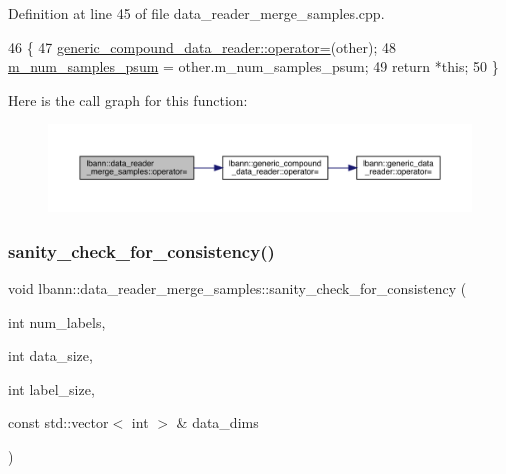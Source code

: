 Definition at line 45 of file data\+\_\+reader\+\_\+merge\+\_\+samples.\+cpp.


\begin{DoxyCode}
46                                           \{
47   \hyperlink{classlbann_1_1generic__compound__data__reader_a7ece97b6fd2bc62da4d98f29cfb50155}{generic\_compound\_data\_reader::operator=}(other);
48   \hyperlink{classlbann_1_1data__reader__merge__samples_afd297d61c11bb6b0d03ce64836bd1300}{m\_num\_samples\_psum} = other.m\_num\_samples\_psum;
49   \textcolor{keywordflow}{return} *\textcolor{keyword}{this};
50 \}
\end{DoxyCode}
Here is the call graph for this function\+:\nopagebreak
\begin{figure}[H]
\begin{center}
\leavevmode
\includegraphics[width=350pt]{classlbann_1_1data__reader__merge__samples_a781fcc341e120886a3359e8ab41121d7_cgraph}
\end{center}
\end{figure}
\mbox{\label{classlbann_1_1data__reader__merge__samples_a240368aa9f7f2ab1fa7c8d534b7f54ed}} 
\subsubsection{\texorpdfstring{sanity\+\_\+check\+\_\+for\+\_\+consistency()}{sanity\_check\_for\_consistency()}}
{\footnotesize\ttfamily void lbann\+::data\+\_\+reader\+\_\+merge\+\_\+samples\+::sanity\+\_\+check\+\_\+for\+\_\+consistency (\begin{DoxyParamCaption}\item[{int}]{num\+\_\+labels,  }\item[{int}]{data\+\_\+size,  }\item[{int}]{label\+\_\+size,  }\item[{const std\+::vector$<$ int $>$ \&}]{data\+\_\+dims }\end{DoxyParamCaption})\hspace{0.3cm}{\ttfamily [protected]}}



